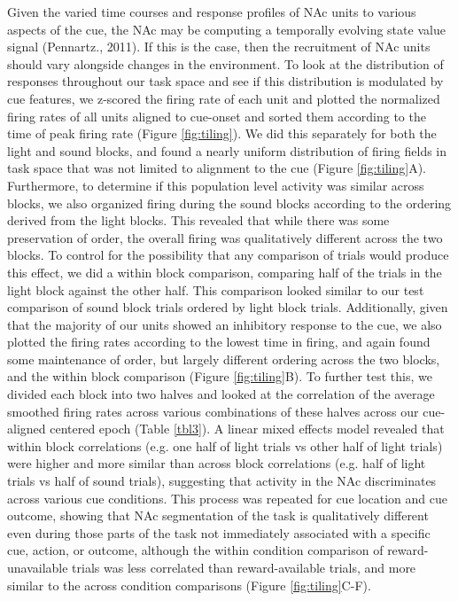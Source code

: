 \documentclass[11pt]{article}
\begin{document}
Given the varied time courses and response profiles of NAc units to various aspects of the cue, the NAc may be computing a temporally evolving state value signal (Pennartz., 2011). If this is the case, then the recruitment of NAc units should vary alongside changes in the environment. To look at the distribution of responses throughout our task space and see if this distribution is modulated by cue features, we z-scored the firing rate of each unit and plotted the normalized firing rates of all units aligned to cue-onset and sorted them according to the time of peak firing rate (Figure \ref{fig:tiling}). We did this separately for both the light and sound blocks, and found a nearly uniform distribution of firing fields in task space that was not limited to alignment to the cue (Figure \ref{fig:tiling}A). Furthermore, to determine if this population level activity was similar across blocks, we also organized firing during the sound blocks according to the ordering derived from the light blocks. This revealed that while there was some preservation of order, the overall firing was qualitatively different across the two blocks. To control for the possibility that any comparison of trials would produce this effect, we did a within block comparison, comparing half of the trials in the light block against the other half. This comparison looked similar to our test comparison of sound block trials ordered by light block trials. Additionally, given that the majority of our units showed an inhibitory response to the cue, we also plotted the firing rates according to the lowest time in firing, and again found some maintenance of order, but largely different ordering across the two blocks, and the within block comparison (Figure \ref{fig:tiling}B). To further test this, we divided each block into two halves and looked at the correlation of the average smoothed firing rates across various combinations of these halves across our cue-aligned centered epoch (Table \ref{tbl3}). A linear mixed effects model revealed that within block correlations (e.g. one half of light trials vs other half of light trials) were higher and more similar than across block correlations (e.g. half of light trials vs half of sound trials), suggesting that activity in the NAc discriminates across various cue conditions. This process was repeated for cue location and cue outcome, showing that NAc segmentation of the task is qualitatively different even during those parts of the task not immediately associated with a specific cue, action, or outcome, although the within condition comparison of reward-unavailable trials was less correlated than reward-available trials, and more similar to the across condition comparisons (Figure \ref{fig:tiling}C-F). 
\end{document}
